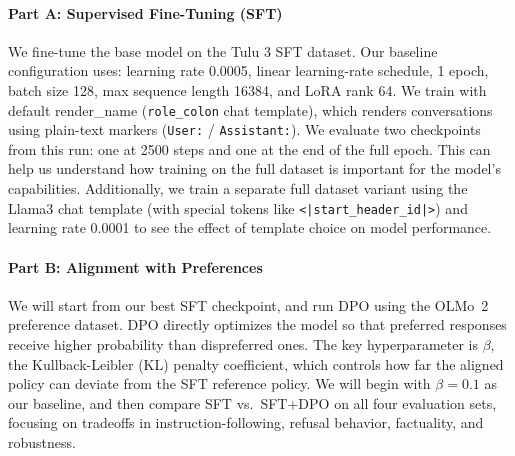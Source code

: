 \documentclass[11pt]{article}
\begin{document}
\paragraph{Part A: Supervised Fine-Tuning (SFT)}
We fine-tune the base model on the Tulu 3 SFT dataset. Our baseline configuration uses: learning rate 0.0005, linear learning-rate schedule, 1 epoch, batch size 128, max sequence length 16384, and LoRA rank 64. We train with default render\_name (\texttt{role\_colon} chat template), which renders conversations using plain-text markers (\texttt{User:} / \texttt{Assistant:}). 
We evaluate two checkpoints from this run: one at 2500 steps and one at the end of the full epoch. This can help us understand how training on the full dataset is important for the model's capabilities. Additionally, we train a separate full dataset variant using the Llama3 chat template (with special tokens like \texttt{<|start\_header\_id|>}) and learning rate 0.0001 to see the effect of template choice on model performance.
\paragraph{Part B: Alignment with Preferences}
We will start from our best SFT checkpoint, and run DPO using the OLMo~2 preference dataset. DPO directly optimizes the model so that preferred responses receive higher probability than dispreferred ones. The key hyperparameter is $\beta$, the Kullback-Leibler (KL) penalty coefficient, which controls how far the aligned policy can deviate from the SFT reference policy. We will begin with $\beta = 0.1$ as our baseline, and then compare SFT vs.\ SFT+DPO on all four evaluation sets, focusing on tradeoffs in instruction-following, refusal behavior, factuality, and robustness.
 
\end{document}
